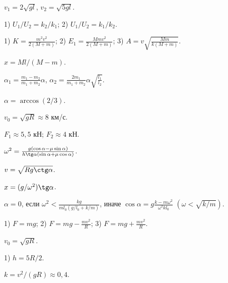 \begin{Answer}{81}
$v_1 = 2\sqrt{gl}$, $v_2 = \sqrt{5gl}$.
\end{Answer}
\begin{Answer}{82}
1) $U_1/U_2 = k_2/k_1$; 2) $U_1/U_2 = k_1/k_2$.
\end{Answer}
\begin{Answer}{83}
1) $K=\frac{m^2v^2}{2(M+m)}$; 2) $E_1 = \frac{Mmv^2}{2(M+m)}$; 3) $A = v\sqrt{\frac{Mm}{k(M+m)}}$.
\end{Answer}
\begin{Answer}{84}
$x = Ml/(M-m)$.
\end{Answer}
\begin{Answer}{85}
$\alpha_1 =\frac{m_1-m_2}{m_1+m_2}\alpha$, $\alpha_2 =\frac{2m_1}{m_1+m_2}\alpha \sqrt{\frac{l_1}{l_2}}$.
\end{Answer}
\begin{Answer}{86}
$\alpha = \arccos(2/3)$.
\end{Answer}
\begin{Answer}{87}
$v_0 = \sqrt{gR} \approx 8$ км/с.
\end{Answer}
\begin{Answer}{88}
$F_1 \approx 5,5$ кН; $F_2 \approx 4$ кН.
\end{Answer}
\begin{Answer}{89}
$\omega^2 = \frac{g(\cos \alpha - \mu \sin \alpha)}{h \tg \alpha (\sin \alpha + \mu \cos \alpha)}$.
\end{Answer}
\begin{Answer}{90}
$v = \sqrt{Rg \ctg \alpha}$.
\end{Answer}
\begin{Answer}{91}
$x = (g/\omega^2) \tg \alpha$.
\end{Answer}
\begin{Answer}{92}
$\alpha = 0$, если $\omega^2 < \frac{kg}{ml_0(g/l_0 + k/m)}$, иначе $\cos \alpha = g\frac{k-m\omega^2}{\omega^2kl_0}$ $\left( \omega < \sqrt{k/m} \right)$.
\end{Answer}
\begin{Answer}{93}
1) $F=mg$; 2) $F=mg-\frac{mv^2}{R}$; 3) $F=mg+\frac{mv^2}{R}$.
\end{Answer}
\begin{Answer}{94}
$v_0 = \sqrt{gR}$.
\end{Answer}
\begin{Answer}{95}
1) $h=5R/2$.
\end{Answer}
\begin{Answer}{96}
$k=v^2/(gR) \approx 0,4$.
\end{Answer}
